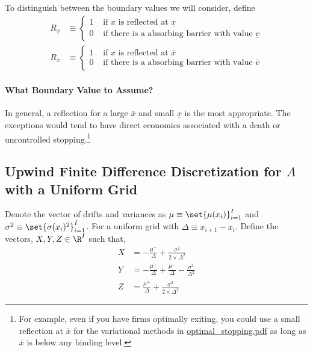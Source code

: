 \documentclass[11pt]{etk-article}
\begin{document}
To distinguish between the boundary values we will consider, define
\begin{align}
	R_{\underline{x}} &\equiv \begin{cases}
		1 & \text{ if $x$ is reflected at $\underline{x}$}\\
		0 & \text{ if there is a absorbing barrier with value $\underline{v}$}
	\end{cases}\label{eq:R-x-min}\\
	R_{\bar{x}} &\equiv \begin{cases}
	1 & \text{ if $x$ is reflected at $\bar{x}$}\\
	0 & \text{ if there is a absorbing barrier with value $\bar{v}$}
\end{cases}\label{eq:R-x-max}
\end{align}	
\paragraph{What Boundary Value to Assume?}
In general, a reflection for a large $\bar{x}$ and small $\underline{x}$ is the most appropriate.  The exceptions would tend to have direct economics associated with a death or uncontrolled stopping.\footnote{For example, even if you have firms optimally exiting, you could use a small reflection at $\bar{x}$ for the variational methods in \url{optimal_stopping.pdf} as long as $\bar{x}$ is below any binding level.}

\subsection{Upwind Finite Difference Discretization for $A$ with a Uniform Grid}
Denote the vector of drifts and variances as $\mu \equiv \set{\mu(x_i)}_{i=1}^I$ and $\sigma^2 \equiv \set{\sigma(x_i)^2}_{i=1}^I$.  For a uniform grid with $\Delta \equiv x_{i+1} - x_i$.  Define the vectors, $X,Y,Z \in \R^I$ such that,
\begin{align}
	X &= - \frac{\mu^{-}}{\Delta} + \frac{\sigma^{2}}{2\times \Delta^{2}}\label{eq:X} \\
	Y &= - \frac{\mu^{+}}{\Delta} + \frac{\mu^{-}}{\Delta} - \frac{\sigma^{2}}{\Delta^{2}}\label{eq:Y} \\
	Z &= \frac{\mu^{+}}{\Delta} + \frac{\sigma^{2}}{2\times \Delta^{2}}\label{eq:Z}
\end{align}
\end{document}
